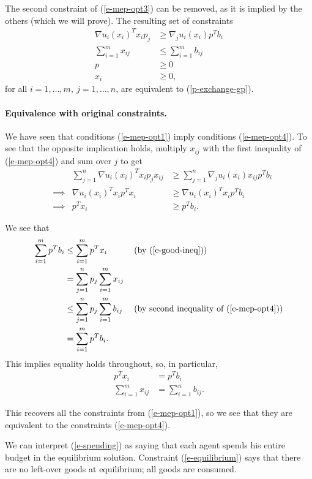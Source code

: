 \documentclass[12pt]{article}
\begin{document}
The second constraint of (\ref{e-mep-opt3}) can be removed, as it is implied by
the others (which we will prove). The resulting set of constraints
\begin{equation}
\begin{aligned}
\nabla u_i(x_i)^T x_i p_j &\geq \nabla_j u_i(x_i) p^T b_i\\
\sum_{i=1}^m x_{ij} &\leq \sum_{i=1}^m b_{ij}\\
p &\geq 0\\
x_i &\geq 0,
\end{aligned}
\label{e-mep-opt4}
\end{equation}
for all $i=1,\ldots,m,\ j=1,\ldots,n$, are equivalent to (\ref{p-exchange-gp}).

\paragraph{Equivalence with original constraints.}
We have seen that conditions (\ref{e-mep-opt1}) imply conditions (\ref{e-mep-opt4}).
To see that the opposite implication holds,
multiply $x_{ij}$ with the first inequality of (\ref{e-mep-opt4}) and sum over $j$ to get
\begin{align}
&&\sum_{j=1}^n \nabla u_i(x_i)^T x_i p_j x_{ij} &\geq \sum_{j=1}^n \nabla_j u_i(x_i) x_{ij} p^T b_i \nonumber \\
&\implies & \nabla u_i(x_i)^T x_i p^T x_i &\geq \nabla u_i(x_i)^T x_i p^T b_i \nonumber\\
&\implies & p^T x_i &\geq p^T b_i. \label{e-good-ineq}
\end{align}

We see that
\begin{align*}
\sum_{i=1}^m p^T b_i &\leq \sum_{i=1}^m p^T x_i\ &&\text{(by (\ref{e-good-ineq}))}\\
&= \sum_{j=1}^n p_j \sum_{i=1}^m x_{ij} &&\\
&\leq \sum_{j=1}^n p_j \sum_{i=1}^m b_{ij}\ &&\text{(by second inequality of (\ref{e-mep-opt4}))}\\
&= \sum_{i=1}^m p^T b_i.&&
\end{align*}
This implies equality holds throughout, so, in particular,
\begin{align}
p^T x_i &= p^T b_i \label{e-spending}\\
\sum_{i=1}^m x_{ij} &= \sum_{i=1}^n b_{ij} \label{e-equilibrium}.
\end{align}

This recovers all the constraints from (\ref{e-mep-opt1}), so we see that they
are equivalent to the constraints (\ref{e-mep-opt4}).

We can interpret (\ref{e-spending}) as saying that each agent spends his entire
budget in the equilibrium solution. Constraint (\ref{e-equilibrium}) says that
there are no left-over goods at equilibrium; all goods are consumed.

\newpage


\end{document}
